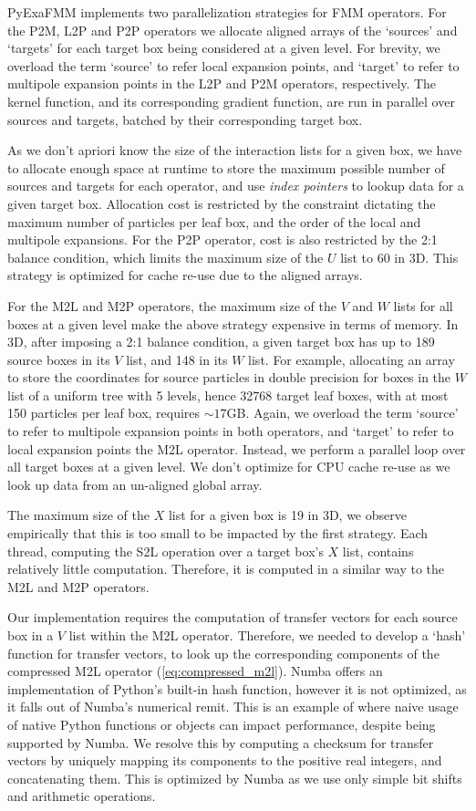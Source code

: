 \documentclass{IEEEcsmag}
\begin{document}
PyExaFMM implements two parallelization strategies for FMM operators. For the P2M, L2P and P2P operators we allocate aligned arrays of the `sources' and `targets' for each target box being considered at a given level. For brevity, we overload the term `source' to refer local expansion points, and `target' to refer to multipole expansion points in the L2P and P2M operators, respectively. The kernel function, and its corresponding gradient function, are run in parallel over sources and targets, batched by their corresponding target box.

As we don't apriori know the size of the interaction lists for a given box, we have to allocate enough space at runtime to store the maximum possible number of sources and targets for each operator, and use \textit{index pointers} to lookup data for a given target box. Allocation cost is restricted by the constraint dictating the maximum number of particles per leaf box, and the order of the local and multipole expansions. For the P2P operator, cost is also restricted by the 2:1 balance condition, which limits the maximum size of the $U$ list to 60 in 3D. This strategy is optimized for cache re-use due to the aligned arrays.

For the M2L and M2P operators, the maximum size of the $V$ and $W$ lists for all boxes at a given level make the above strategy expensive in terms of memory. In 3D, after imposing a 2:1 balance condition, a given target box has up to 189 source boxes in its $V$ list, and 148 in its $W$ list. For example, allocating an array to store the coordinates for source particles in double precision for boxes in the $W$ list of a uniform tree with 5 levels, hence 32768 target leaf boxes, with at most 150 particles per leaf box, requires $\sim 17$GB. Again, we overload the term `source' to refer to multipole expansion points in both operators, and `target' to refer to local expansion points the M2L operator. Instead, we perform a parallel loop over all target boxes at a given level. We don't optimize for CPU cache re-use as we look up data from an un-aligned global array.

The maximum size of the $X$ list for a given box is 19 in 3D, we observe empirically that this is too small to be impacted by the first strategy. Each thread, computing the S2L operation over a target box's $X$ list, contains relatively little computation. Therefore, it is computed in a similar way to the M2L and M2P operators.

Our implementation requires the computation of transfer vectors for each source box in a $V$ list within the M2L operator. Therefore, we needed to develop a `hash' function for transfer vectors, to look up the corresponding components of the compressed M2L operator (\ref{eq:compressed_m2l}). Numba offers an implementation of Python's built-in hash function, however it is not optimized, as it falls out of Numba's numerical remit. This is an example of where naive usage of native Python functions or objects can impact performance, despite being supported by Numba. We resolve this by computing a checksum for transfer vectors by uniquely mapping its components to the positive real integers, and concatenating them. This is optimized by Numba as we use only simple bit shifts and arithmetic operations.
\end{document}
